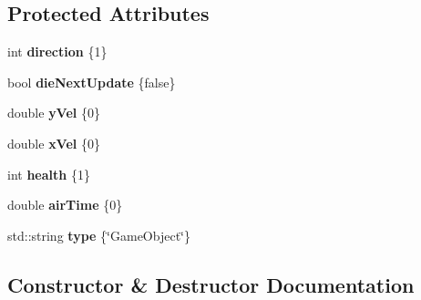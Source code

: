 \subsection*{Protected Attributes}
\begin{DoxyCompactItemize}
\item 
\hypertarget{class_game_object_a800205ed5a8c1e75727157ca2fc05e3a}{}int {\bfseries direction} \{1\}\label{class_game_object_a800205ed5a8c1e75727157ca2fc05e3a}

\item 
\hypertarget{class_game_object_a583d4de3d4a6c8c5e6bdd99dce383854}{}bool {\bfseries die\+Next\+Update} \{false\}\label{class_game_object_a583d4de3d4a6c8c5e6bdd99dce383854}

\item 
\hypertarget{class_game_object_aec7475f944e4d3ed46953c452513929f}{}double {\bfseries y\+Vel} \{0\}\label{class_game_object_aec7475f944e4d3ed46953c452513929f}

\item 
\hypertarget{class_game_object_a8ec343c42814fd6f61cb32feb9e060cb}{}double {\bfseries x\+Vel} \{0\}\label{class_game_object_a8ec343c42814fd6f61cb32feb9e060cb}

\item 
\hypertarget{class_game_object_a35313c55194b2c2c42270bbc97306b76}{}int {\bfseries health} \{1\}\label{class_game_object_a35313c55194b2c2c42270bbc97306b76}

\item 
\hypertarget{class_game_object_aa1ece14d94ea4cdb1bb497889bdf70a3}{}double {\bfseries air\+Time} \{0\}\label{class_game_object_aa1ece14d94ea4cdb1bb497889bdf70a3}

\item 
\hypertarget{class_game_object_a15cb8c7ceed697b8f7eefe79675875dd}{}std\+::string {\bfseries type} \{\char`\"{}Game\+Object\char`\"{}\}\label{class_game_object_a15cb8c7ceed697b8f7eefe79675875dd}

\end{DoxyCompactItemize}


\subsection{Constructor \& Destructor Documentation}
\hypertarget{class_game_object_a20572b6ae69d08069628c089cf443579}{}
